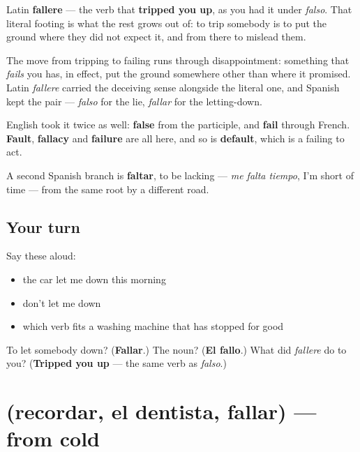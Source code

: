 \begin{cousinweb}
Latin \textbf{fallere} — the verb that \textbf{tripped you up}, as you had it under \emph{falso}. That literal footing is what the rest grows out of: to trip somebody is to put the ground where they did not expect it, and from there to mislead them.

The move from tripping to failing runs through disappointment: something that \emph{fails} you has, in effect, put the ground somewhere other than where it promised. Latin \emph{fallere} carried the deceiving sense alongside the literal one, and Spanish kept the pair — \emph{falso} for the lie, \emph{fallar} for the letting-down.

English took it twice as well: \textbf{false} from the participle, and \textbf{fail} through French. \textbf{Fault}, \textbf{fallacy} and \textbf{failure} are all here, and so is \textbf{default}, which is a failing to act.

A second Spanish branch is \textbf{faltar}, to be lacking — \emph{me falta tiempo}, I'm short of time — from the same root by a different road.
\end{cousinweb}

\subsection*{Your turn}
Say these aloud:

\begin{itemize}
\raggedright
  \item the car let me down this morning
  \item don't let me down
  \item which verb fits a washing machine that has stopped for good
\end{itemize}

\begin{tcolorbox}[breakable,colback=teal!4,colframe=teal!35!black,title={Before you move on}]
To let somebody down? (\textbf{Fallar}.) The noun? (\textbf{El fallo}.) What did \emph{fallere} do to you? (\textbf{Tripped you up} — the same verb as \emph{falso}.)
\end{tcolorbox}
\section[(recordar, el dentista, fallar)]{(recordar, el dentista, fallar) — from cold}

\label{lesson:ES-R464-repaso-cita}



